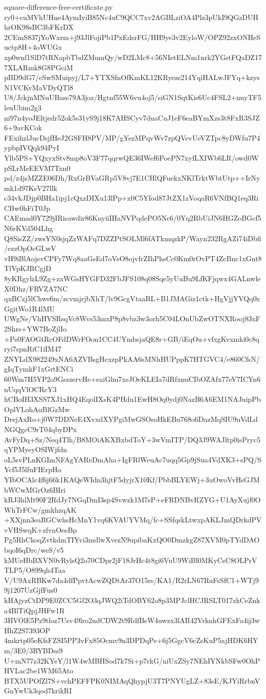 \documentclass[11pt]{article}
\theoremstyle{definition}
\theoremstyle{remark}
\begin{document}
\begin{filecontents*}[overwrite]{square-difference-free-certificate.py}
ry0+cuMVhUHne4AymIyiB85Nc4uC9QCC7xv2AGBLziOA4Plz3pUkI9QGzDUHhrOK98sBC3bFKrDX
2CEmS837jYoWxrm+j93JlFojiPb1PxEdsrFG/HH9ye3v2EyloW/OPZ92zxONHeSuctp8H+4oWUGx
xp0wnf1SlD7tRNapbTbdZMumQy/wD2LMc8+56NIetELNm1nrk2YGstFQaDZ177XLARmk8G8PGciM
pBD9dG7/eSwSMuipyj/L7+YTXSfnOfKmKL12KRyezs214YqiHALwJFYq+kzysN1VCKvMaVDyQTl8
U8/JckjnMNuUBass79A3joz/Hgtnf55W6vu4oj5/siGN1SqtKis6Uc4FSL2+nuyTF5leuUbim2g3
ni97n4yoJEltjedr52ok5s31yS9j18K7AHSCyv7duaCuJ1eF6eaBYmXzs3t8FxR3SJZ6+9avKCok
FExihzlJucDsjfHeJ2GSFH8PV/MP/gYezMPqvWv7zpQVevUeVZTpc8yDWfu7P4ypbpIVQqk94PyI
Ylb5PS+YQxyxStv8mp8oV3F77qqrwQE36IWef6PoePN7xyfLXIWb6LR/owd0WpSLrMeEEVM7Txn0
pd/z4jsMZZE06Dh/RxGrBVaGRp5V8vj7E1CHlQFuekxNKlTrktWbtUtp++IrNymk1d97KsV27llk
c34vkJDjp0BHa1ipj1cQxzDIXu13lPp+x0C5Yfod87JtZX1zVoqaR6VNfBQ1eq3RiCBw0hFiT0Jp
CAEmad0Y729jIRisawdir86KnyiiIHaNVPqdePO5Nc6/0Yq2RbUiJN6HGZoBGcf5N6rKVd504Lhg
Q8SisZZ/zwsYN0sjqZzWAFq7DZZPtSOLMl6fATkmqzkP/Wayn232RgAZi74iDbfi/ezzOpOcGLwV
vH9iBlAojevCPFy7Wq8aaGsEd7oVsO8ojvfrZIhPhsCc0Km0rOvPT4ZcBnc1xGnt8TfVpKJRCgjD
8yKRgylzL9Zg+zxWGsHYGFD32FbJFS108q08Sqe5yUuBu9LfKFjqwx4GALnwleX0Dhz/FRVZA7NC
qxBCzj5lChws6m/zcvmjrjbXhT/lv9GcgVtaaRL+B1JMAGiz1ctk+HgVjjYVQq0zGgitWo1R4lMU
UWgNe/VhHVSRsqVc8Wvs53mxP8p8vbz3w3orh5C04LOnUbZwOTNXRooj83xF2Shrs+YW7BoZjlIo
+Ps0FAOGtRcOFdDWrFOon1CC4UYmbsjaQE8r+GB/iEqOu+vfxgKvxmki0c8qryi7spnRiC1iIM47
ZNYLdX982249xNA6AZVBsgHcxzpPkAA6sMNhHUPppK7HTGVC4/e860CfsN/gIqTymkF1xGrtENCi
60Wm7H5YP2o9GszzervHe+eaiGhu7xsJOeKLEIa7dRfxnuCIbOZAfx77eV7ICYn6nUqqVlOCRcY3
hCBoIH3XSS7XJ1xHQ4EqolIXsK4PHdu1EwH8Oq0ydj0NazB6A6EM1NAJnipPbOplVLohAuBlGzMw
DrejAxRo+j0W7DDNeE4XvxdXVPgiMwGSOsoHkEBu768o6DazMqSIU9uVdLdNGQgcC9rT04qbyDPx
AvFyDq+Sz/Neq4Tlh/B8MOiAKXBxbdToY+3wVmITP/DQ3J9WAJltp0isPryc5qYPMyeyOSIWjfdn
oL5svPLnKGImNFAgYAReDmAha+IgFRlWeuAc7uqq5Gp9jSua4VdXK3+sPQ/SYcf5J5lfuFIErpHo
YIbOCAlc4f6j66k1KAQeWIdn3hjtF5dyjrX10Kf/PbbBLYEWj+3uOwoVvHsGJMbWCwMGrOz6BIri
kRJ3hlMt90F2RdJy7NGqDmI3sp4Svwzk1M7sP+eFRDNBvRZYG+U1AyXujf0OWhTrFCw/gmkhzqAK
+XXjnn3eaRGCwhsHcMnY1vq6KVAUYVMq/fc+SSfqskLtwxpAKLJmQDrkdPVvVHSwqK+zfvnOeeBp
Pg5RhCkoqZvtkdmTIYvi3mdlwXvezN9upibaKxQO0DmzkgZ87XVM0pTYdDAObqoI6qDrc/weS/v5
kMUeHbBXVN0vRylsQ2o70CDpr2jF18JrHc4t8gi6VuU9WiBl0MKyCsC8OLPrVTLP5/O899qh4Taa
V/U9AxRBKw7da4dfPpvtAcwZQDtAr37O15rs/KA1/R2rLN67RuFsSfC1+WTj99j1207UzGjfFus0
kHAjyzCtDP9E0ZCC5Gf2O3qJWQ2iTdOBY62o8p3MPJclHCJRSLT017zkCeZnka4BlTiQpjJHFw1R
3HVOlE5Pz9tloz7Usv49lro2ndCDW2t9RdfBsW4uwzx3lAR42VrknhGFExFa4ij3wHhZ2S7393OP
4mkrtp05eKfsFZSI5PP3vFx85Ocmv9n3DPDqPe+6j5GgcV6cZsKuP5ajHDK6HYm/3E0/3RYBDss9
U+mN77z32KYeY/l1W4wMBHSod7k7Si+p7rkG/niUxZSy7NEhIYNkbSFw0OhPHVLac2be1WM65Ato
BTX5UPOfZl7S+vchPEFFPK0NIMAqQhypjU3T7PNYUgLZ+83sE/KJYiRrbnVGnYwUk3qod7krikRI

\end{filecontents*}
\end{document}
